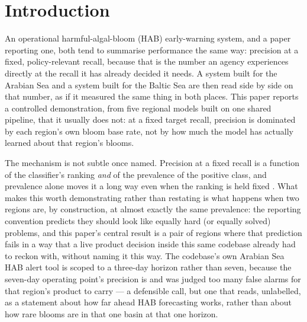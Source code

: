%

\section{Introduction}

An operational harmful-algal-bloom (HAB) early-warning system, and a paper
reporting one, both tend to summarise performance the same way: precision at
a fixed, policy-relevant recall, because that is the number an agency
experiences directly at the recall it has already decided it needs. A system
built for the Arabian Sea and a system built for the Baltic Sea are then read
side by side on that number, as if it measured the same thing in both places.
This paper reports a controlled demonstration, from five regional models
built on one shared pipeline, that it usually does not: at a fixed target
recall, precision is dominated by each region's own bloom base rate, not by
how much the model has actually learned about that region's blooms.

The mechanism is not subtle once named. Precision at a fixed recall is a
function of the classifier's ranking \emph{and} of the prevalence of the
positive class, and prevalence alone moves it a long way even when the
ranking is held fixed \citep{davis2006}. What makes this worth demonstrating
rather than restating is what happens when two regions are, by construction,
at almost exactly the same prevalence: the reporting convention predicts they
should look like equally hard (or equally solved) problems, and this paper's
central result is a pair of regions where that prediction fails in a way
that a live product decision inside this same codebase already had to
reckon with, without naming it this way. The codebase's own Arabian Sea HAB
alert tool is scoped to a three-day horizon rather than seven, because the
seven-day operating point's precision is
\HabArabianPrecSeven{} and was judged too many false alarms for that region's
product to carry --- a defensible call, but one that reads, unlabelled, as a
statement about how far ahead HAB forecasting works, rather than about how
rare blooms are in that one basin at that one horizon.

